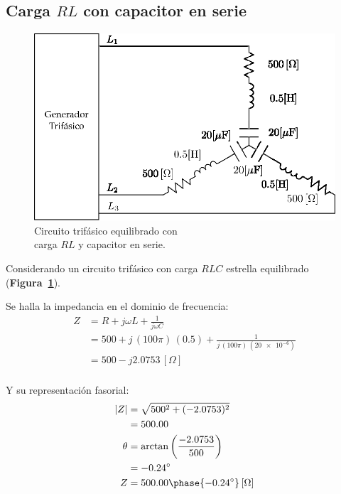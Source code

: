 \documentclass[letter,11pt]{article}
\begin{document}
\subsection{Carga $RL$ con capacitor en serie}
\begin{figure}[!h]
\centering
\includegraphics[scale=0.9]{figura2.eps}
\caption{Circuito trifásico equilibrado con \\carga $RL$ y capacitor en serie.}
\label{circuito2}
\end{figure}

Considerando un circuito trifásico con carga $RLC$ estrella equilibrado
(\textbf{Figura~\ref{circuito2}}).

Se halla la impedancia en el dominio de frecuencia:
\begin{equation*}
    \begin{split}
        Z &= R+j\omega L+\frac{1}{j\omega C}\\
          &= 500+j\,(100\pi)\,(0.5)+\frac{1}{j\,(100\pi)\,(\num{20e-6})}\\
          &= 500-j2.0753\,[\Omega]\\
    \end{split}
\end{equation*}

Y su representación fasorial:
\begin{equation*}
    \begin{split}
        |Z| &= \sqrt{500^2+(-2.0753)^2}\\
            &= 500.00\\
        \theta &= \arctan\left(\frac{-2.0753}{500}\right)\\
               &= -0.24^{\circ}\\
        Z &= 500.00\phase{-0.24^{\circ}}\,[\Omega]\\
    \end{split}
\end{equation*}
\end{document}
